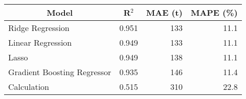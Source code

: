
\begin{tabular}[t]{lrrr}
\toprule
\multicolumn{1}{c}{Model} & \multicolumn{1}{c}{R$^2$} & \multicolumn{1}{c}{MAE (t)} & \multicolumn{1}{c}{MAPE (\%)}\\
\midrule
Ridge Regression & 0.951 & 133 & 11.1\\
Linear Regression & 0.949 & 133 & 11.1\\
Lasso & 0.949 & 138 & 11.1\\
Gradient Boosting Regressor & 0.935 & 146 & 11.4\\
Calculation & 0.515 & 310 & 22.8\\
\bottomrule
\end{tabular}
